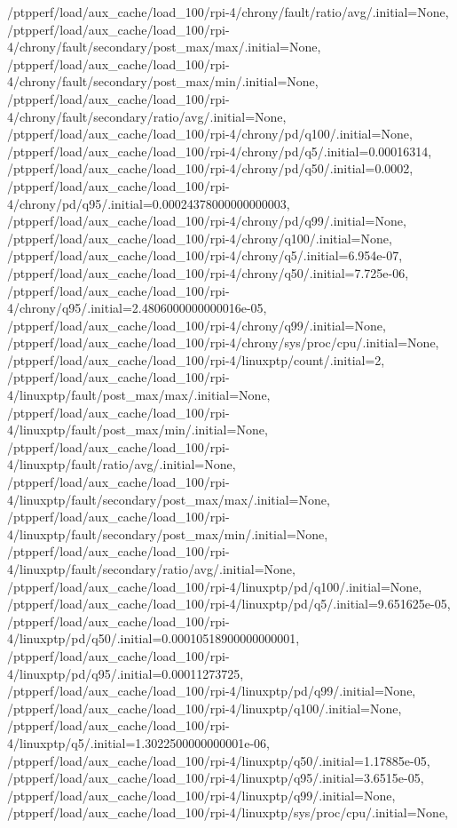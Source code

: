 {    /ptpperf/load/aux_cache/load_100/rpi-4/chrony/fault/ratio/avg/.initial=None,
    /ptpperf/load/aux_cache/load_100/rpi-4/chrony/fault/secondary/post_max/max/.initial=None,
    /ptpperf/load/aux_cache/load_100/rpi-4/chrony/fault/secondary/post_max/min/.initial=None,
    /ptpperf/load/aux_cache/load_100/rpi-4/chrony/fault/secondary/ratio/avg/.initial=None,
    /ptpperf/load/aux_cache/load_100/rpi-4/chrony/pd/q100/.initial=None,
    /ptpperf/load/aux_cache/load_100/rpi-4/chrony/pd/q5/.initial=0.00016314,
    /ptpperf/load/aux_cache/load_100/rpi-4/chrony/pd/q50/.initial=0.0002,
    /ptpperf/load/aux_cache/load_100/rpi-4/chrony/pd/q95/.initial=0.00024378000000000003,
    /ptpperf/load/aux_cache/load_100/rpi-4/chrony/pd/q99/.initial=None,
    /ptpperf/load/aux_cache/load_100/rpi-4/chrony/q100/.initial=None,
    /ptpperf/load/aux_cache/load_100/rpi-4/chrony/q5/.initial=6.954e-07,
    /ptpperf/load/aux_cache/load_100/rpi-4/chrony/q50/.initial=7.725e-06,
    /ptpperf/load/aux_cache/load_100/rpi-4/chrony/q95/.initial=2.4806000000000016e-05,
    /ptpperf/load/aux_cache/load_100/rpi-4/chrony/q99/.initial=None,
    /ptpperf/load/aux_cache/load_100/rpi-4/chrony/sys/proc/cpu/.initial=None,
    /ptpperf/load/aux_cache/load_100/rpi-4/linuxptp/count/.initial=2,
    /ptpperf/load/aux_cache/load_100/rpi-4/linuxptp/fault/post_max/max/.initial=None,
    /ptpperf/load/aux_cache/load_100/rpi-4/linuxptp/fault/post_max/min/.initial=None,
    /ptpperf/load/aux_cache/load_100/rpi-4/linuxptp/fault/ratio/avg/.initial=None,
    /ptpperf/load/aux_cache/load_100/rpi-4/linuxptp/fault/secondary/post_max/max/.initial=None,
    /ptpperf/load/aux_cache/load_100/rpi-4/linuxptp/fault/secondary/post_max/min/.initial=None,
    /ptpperf/load/aux_cache/load_100/rpi-4/linuxptp/fault/secondary/ratio/avg/.initial=None,
    /ptpperf/load/aux_cache/load_100/rpi-4/linuxptp/pd/q100/.initial=None,
    /ptpperf/load/aux_cache/load_100/rpi-4/linuxptp/pd/q5/.initial=9.651625e-05,
    /ptpperf/load/aux_cache/load_100/rpi-4/linuxptp/pd/q50/.initial=0.00010518900000000001,
    /ptpperf/load/aux_cache/load_100/rpi-4/linuxptp/pd/q95/.initial=0.00011273725,
    /ptpperf/load/aux_cache/load_100/rpi-4/linuxptp/pd/q99/.initial=None,
    /ptpperf/load/aux_cache/load_100/rpi-4/linuxptp/q100/.initial=None,
    /ptpperf/load/aux_cache/load_100/rpi-4/linuxptp/q5/.initial=1.3022500000000001e-06,
    /ptpperf/load/aux_cache/load_100/rpi-4/linuxptp/q50/.initial=1.17885e-05,
    /ptpperf/load/aux_cache/load_100/rpi-4/linuxptp/q95/.initial=3.6515e-05,
    /ptpperf/load/aux_cache/load_100/rpi-4/linuxptp/q99/.initial=None,
    /ptpperf/load/aux_cache/load_100/rpi-4/linuxptp/sys/proc/cpu/.initial=None,
}
